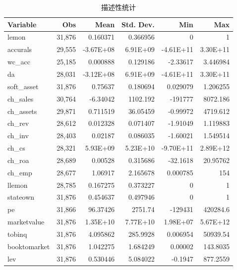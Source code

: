 \documentclass{article}
\begin{document}
\begin{table}[htbp]
  \centering
  \caption{描述性统计}
    \begin{tabular}{p{7.685em}rrrrr} \hline\hline
    Variable & \multicolumn{1}{p{4.13em}}{Obs} & \multicolumn{1}{p{4.13em}}{Mean} & \multicolumn{1}{p{4.13em}}{Std. Dev.} & \multicolumn{1}{p{4.13em}}{Min} & \multicolumn{1}{p{4.13em}}{Max} \\ \hline
    lemon & 31,876 & 0.160371 & 0.366956 & 0     & 1 \\
    accurals & 29,555 & -3.67E+08 & 6.91E+09 & -4.61E+11 & 3.30E+11 \\
    wc\_acc & 25,185 & 0.000888 & 0.129186 & -2.33617 & 3.446984 \\
    da    & 28,031 & -3.12E+08 & 6.91E+09 & -4.61E+11 & 3.30E+11 \\
    soft\_asset & 31,876 & 0.75637 & 0.180694 & 0.029079 & 1.206255 \\
    ch\_sales & 30,764 & -6.34042 & 1102.192 & -191777 & 8072.186 \\
    ch\_assets & 29,871 & 0.711519 & 36.05459 & -0.99972 & 4719.612 \\
    ch\_rev & 28,612 & 0.012328 & 0.071407 & -1.91049 & 1.119883 \\
    ch\_inv & 28,403 & 0.02187 & 0.086035 & -1.60021 & 1.549514 \\
    ch\_cs & 28,321 & 5.93E+09 & 5.23E+10 & -9.70E+11 & 2.89E+12 \\
    ch\_roa & 28,689 & 0.00528 & 0.315686 & -32.1618 & 20.95762 \\
    ch\_emp & 28,677 & 1.06917 & 2.165678 & 0.000785 & 154 \\
    llemon & 28,785 & 0.167275 & 0.373227 & 0     & 1 \\
    stateown & 31,876 & 0.454637 & 0.497946 & 0     & 1 \\
    pe    & 31,866 & 96.37426 & 2751.74 & -129431 & 420284.6 \\
    marketvalue & 31,876 & 1.35E+10 & 7.77E+10 & 1.98E+07 & 5.67E+12 \\
    tobinq & 31,876 & 4.095862 & 285.9928 & 0.006954 & 50939.54 \\
    booktomarket & 31,876 & 1.042275 & 1.684249 & 0.00002 & 143.8035 \\
    lev   & 31,876 & 0.530446 & 5.084022 & -0.1947 & 877.2559 \\ \hline\hline
    \end{tabular}%
  \label{tab:DescriptiveSatistics}%
\end{table}%
\end{document}
